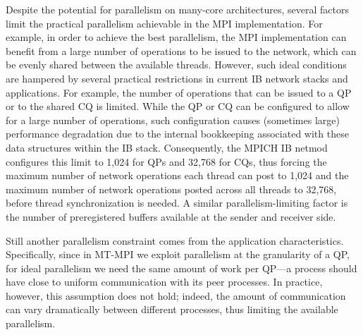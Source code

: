 Despite the potential for parallelism on many-core architectures,
several factors limit the practical parallelism
achievable in the MPI implementation.  For example, in order to
achieve the best parallelism, the MPI implementation can benefit from
a large number of operations to be issued to the network, which can be
evenly shared between the available threads.  However, such ideal
conditions are hampered by several practical restrictions in current
IB network stacks and applications.  For example, the number of
operations that can be issued to a QP or to the shared CQ is limited.
While the QP or CQ can be configured to allow for a large number of
operations, such configuration causes (sometimes large) performance
degradation due to the internal bookkeeping associated with these data
structures within the IB stack.  Consequently, the MPICH IB netmod
configures this limit to 1,024 for QPs and 32,768 for CQs, thus
forcing the maximum number of network operations each thread can post
to 1,024 and the maximum number of network operations posted across
all threads to 32,768, before thread synchronization is needed.  A
similar parallelism-limiting factor is the number of preregistered
buffers available at the sender and receiver side.

Still another parallelism constraint comes from the application
characteristics.  Specifically, since in MT-MPI we exploit parallelism
at the granularity of a QP, for ideal parallelism we need the same
amount of work per QP---a process should have close to uniform
communication with its peer processes.  In practice, however, this
assumption does not hold; indeed, the amount of communication can vary
dramatically between different processes, thus limiting the available
parallelism.

